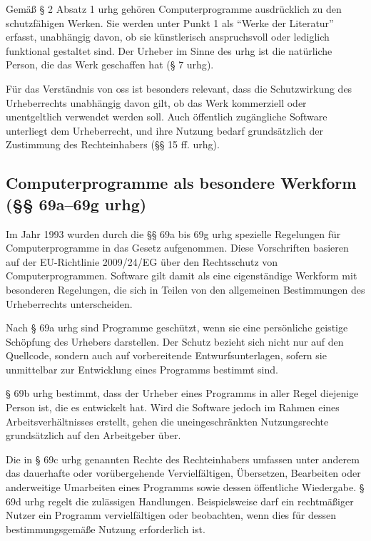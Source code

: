 Gemäß § 2 Absatz 1 \gls{urhg} gehören Computerprogramme ausdrücklich zu den schutzfähigen Werken.
Sie werden unter Punkt 1 als \enquote{Werke der Literatur} erfasst, unabhängig davon, ob sie künstlerisch anspruchsvoll oder lediglich funktional gestaltet sind.
Der Urheber im Sinne des \gls{urhg} ist die natürliche Person, die das Werk geschaffen hat (§ 7 \gls{urhg}).

Für das Verständnis von \gls{oss} ist besonders relevant, dass die Schutzwirkung des Urheberrechts unabhängig davon gilt, ob das Werk kommerziell oder unentgeltlich verwendet werden soll.
Auch öffentlich zugängliche Software unterliegt dem Urheberrecht, und ihre Nutzung bedarf grundsätzlich der Zustimmung des Rechteinhabers (§§ 15 ff. \gls{urhg}).


\subsection{Computerprogramme als besondere Werkform (§§ 69a–69g \gls{urhg})}

Im Jahr 1993 wurden durch die §§ 69a bis 69g \gls{urhg} spezielle Regelungen für Computerprogramme in das Gesetz aufgenommen.
Diese Vorschriften basieren auf der EU-Richtlinie 2009/24/EG über den Rechtsschutz von Computerprogrammen.
Software gilt damit als eine eigenständige Werkform mit besonderen Regelungen, die sich in Teilen von den allgemeinen Bestimmungen des Urheberrechts unterscheiden.

Nach § 69a \gls{urhg} sind Programme geschützt, wenn sie eine persönliche geistige Schöpfung des Urhebers darstellen.
Der Schutz bezieht sich nicht nur auf den Quellcode, sondern auch auf vorbereitende Entwurfsunterlagen, sofern sie unmittelbar zur Entwicklung eines Programms bestimmt sind.

§ 69b \gls{urhg} bestimmt, dass der Urheber eines Programms in aller Regel diejenige Person ist, die es entwickelt hat.
Wird die Software jedoch im Rahmen eines Arbeitsverhältnisses erstellt, gehen die uneingeschränkten Nutzungsrechte grundsätzlich auf den Arbeitgeber über.

Die in § 69c \gls{urhg} genannten Rechte des Rechteinhabers umfassen unter anderem das dauerhafte oder vorübergehende Vervielfältigen, Übersetzen, Bearbeiten oder anderweitige Umarbeiten eines Programms sowie dessen öffentliche Wiedergabe.
§ 69d \gls{urhg} regelt die zulässigen Handlungen.
Beispielsweise darf ein rechtmäßiger Nutzer ein Programm vervielfältigen oder beobachten, wenn dies für dessen bestimmungsgemäße Nutzung erforderlich ist.

